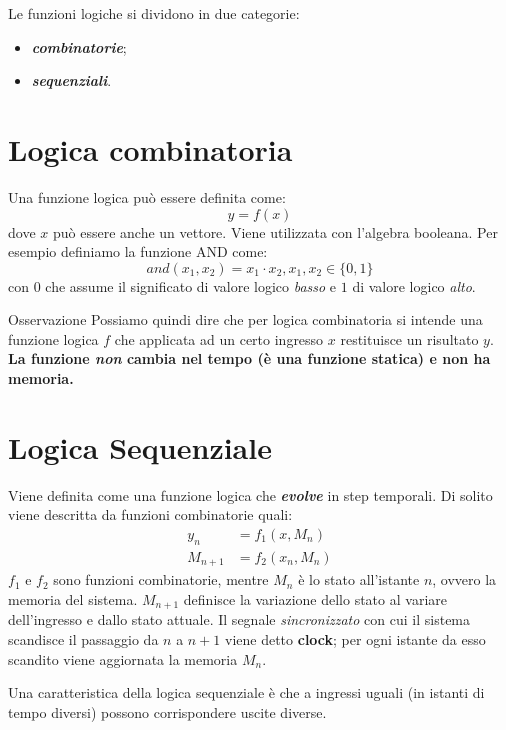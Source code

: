 \documentclass[
]{book}
\providecommand{\tightlist}{%
  \setlength{\itemsep}{0pt}\setlength{\parskip}{0pt}}
\begin{document}
Le funzioni logiche si dividono in due categorie:

\begin{itemize}
\tightlist
\item
  \textbf{\emph{combinatorie}};
\item
  \textbf{\emph{sequenziali}}.
\end{itemize}

\section{Logica combinatoria}\label{logica-combinatoria}

Una funzione logica può essere definita come: \[
y=f(x)
\] dove \(x\) può essere anche un vettore. Viene utilizzata con
l'algebra booleana. Per esempio definiamo la funzione AND come: \[
and(x_{1},x_{2})=x_{1}\cdot x_{2}, x_{1},x_{2}\in\{0,1\}
\] con \(0\) che assume il significato di valore logico \emph{basso} e
\(1\) di valore logico \emph{alto}.

\begin{redbox}{Osservazione}
Possiamo quindi dire che per logica combinatoria si intende una funzione logica $f$ che applicata ad un certo ingresso $x$ restituisce un risultato $y$. \newline
\textbf{La funzione \emph{non} cambia nel tempo (è una funzione statica) e non ha memoria.}
\end{redbox}

\section{Logica Sequenziale}\label{logica-sequenziale}

Viene definita come una funzione logica che \textbf{\emph{evolve}} in
step temporali. Di solito viene descritta da funzioni combinatorie
quali: \begin{align*}
y_{n}&=f_{1}(x,M_{n})\\
M_{n+1}&=f_{2}(x_{n},M_{n})
\end{align*} \(f_{1}\) e \(f_{2}\) sono funzioni combinatorie, mentre
\(M_{n}\) è lo stato all'istante \(n\), ovvero la memoria del sistema.
\(M_{n+1}\) definisce la variazione dello stato al variare dell'ingresso
e dallo stato attuale. Il segnale \emph{sincronizzato} con cui il
sistema scandisce il passaggio da \(n\) a \(n+1\) viene detto
\textbf{clock}; per ogni istante da esso scandito viene aggiornata la
memoria \(M_{n}\).

Una caratteristica della logica sequenziale è che a ingressi uguali (in
istanti di tempo diversi) possono corrispondere uscite diverse.
\end{document}
